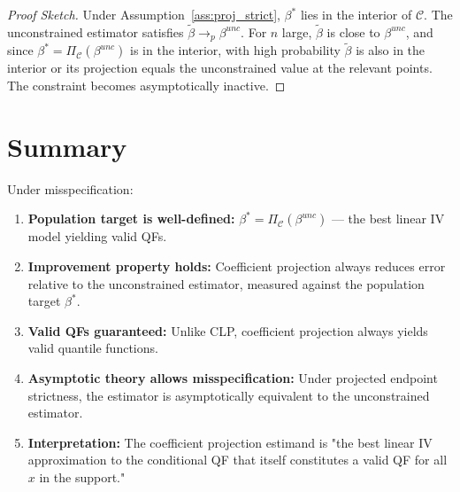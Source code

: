 \documentclass[11pt]{article}
\newcommand{\calC}{\mathcal{C}}
\begin{document}
\begin{proof}[Proof Sketch]
Under Assumption~\ref{ass:proj_strict}, $\beta^*$ lies in the interior of $\calC$. The unconstrained estimator satisfies $\tilde{\beta} \to_p \beta^{unc}$. For $n$ large, $\tilde{\beta}$ is close to $\beta^{unc}$, and since $\beta^* = \Pi_\calC(\beta^{unc})$ is in the interior, with high probability $\tilde{\beta}$ is also in the interior or its projection equals the unconstrained value at the relevant points. The constraint becomes asymptotically inactive.
\end{proof}

\section{Summary}

Under misspecification:

\begin{enumerate}
\item \textbf{Population target is well-defined:} $\beta^* = \Pi_\calC(\beta^{unc})$ — the best linear IV model yielding valid QFs.

\item \textbf{Improvement property holds:} Coefficient projection always reduces error relative to the unconstrained estimator, measured against the population target $\beta^*$.

\item \textbf{Valid QFs guaranteed:} Unlike CLP, coefficient projection always yields valid quantile functions.

\item \textbf{Asymptotic theory allows misspecification:} Under projected endpoint strictness, the estimator is asymptotically equivalent to the unconstrained estimator.

\item \textbf{Interpretation:} The coefficient projection estimand is "the best linear IV approximation to the conditional QF that itself constitutes a valid QF for all $x$ in the support."
\end{enumerate}
\end{document}
